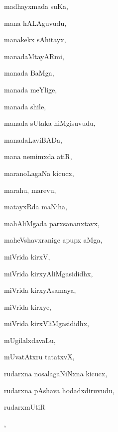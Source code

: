\begin{multicols}{3}
{\noindent
{madhayxmada suKa}, \pageref{madhayxmada suKa}

\noindent
{mana hALAguvudu}, \pageref{mana hALAguvudu}

\noindent
{manakekx sAhitayx}, \pageref{manakekx sAhitayx}

\noindent
{manadaMtayARmi}, \pageref{manadaMtayARmi}

\noindent
{manada BaMga}, \pageref{manada BaMga}

\noindent
{manada meYlige}, \pageref{manada meYlige}

\noindent
{manada shile}, \pageref{manada shile}

\noindent
{manada sUtaka hiMgisuvudu}, \pageref{manada sUtaka hiMgisuvudu}

\noindent
{manadaLaviBADa}, \pageref{manadaLaviBADa}

\noindent
{mana nemimxda atiR}, \pageref{mana nemimxda atiR}

\noindent
{maranoLagaNa kicucx}, \pageref{maranoLagaNa kicucx}

\noindent
{marahu, marevu}, \pageref{marahu, marevu}

\noindent
{matayxRda maNiha}, \pageref{matayxRda maNiha}

\noindent
{mahAliMgada parxsananxtavx}, \pageref{mahAliMgada parxsananxtavx}

\noindent
{maheVshavxranige apupx aMga}, \pageref{maheVshavxranige apupx aMga}

\noindent
{miVrida kirxV}, \pageref{miVrida kirxV}

\noindent
{miVrida kirxyAliMgasididhx}, \pageref{miVrida kirxyAliMgasididhx}

\noindent
{miVrida kirxyAsamaya}, \pageref{miVrida kirxyAsamaya}

\noindent
{miVrida kirxye}, \pageref{miVrida kirxye}

\noindent
{miVrida kirxVliMgasididhx}, \pageref{miVrida kirxVliMgasididhx}

\noindent
{mUgilalxdavaLu}, \pageref{mUgilalxdavaLu}

\noindent
{mUvatAtxru tatatxvX}, \pageref{mUvatAtxru tatatxvX}

\noindent
{rudarxna nosalagaNiNxna kicucx}, \pageref{rudarxna nosalagaNiNxna kicucx}

\noindent
{rudarxna pAshava hodadxdiruvudu}, \pageref{rudarxna pAshava hodadxdiruvudu}

\noindent
{rudarxmUtiR}

\noindent
{}, \pageref{rudarxmUtiR jaMgamavAguvudu}

}
\end{multicols}
